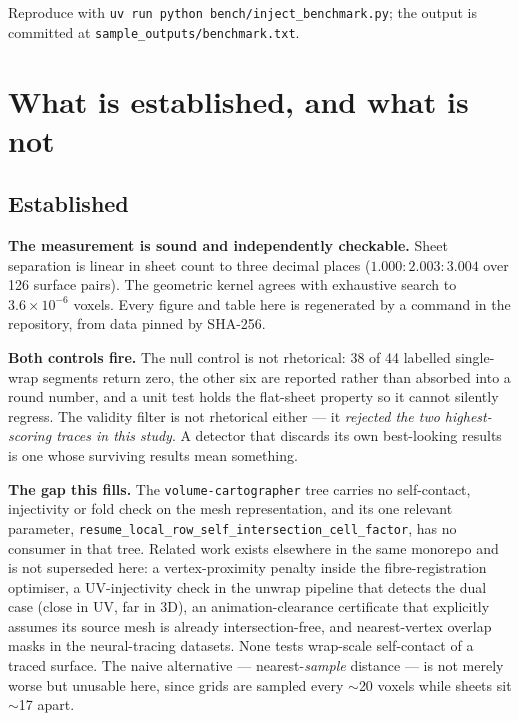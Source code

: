 \documentclass[11pt,a4paper]{article}
\begin{document}
\begin{sloppypar}
Reproduce with \texttt{uv run python bench/inject\_benchmark.py};
the output is committed at \texttt{sample\_outputs/benchmark.txt}.
\end{sloppypar}

\section{What is established, and what is not}

\subsection*{Established}

\textbf{The measurement is sound and independently checkable.} Sheet separation
is linear in sheet count to three decimal places ($1.000 : 2.003 : 3.004$ over
126 surface pairs). The geometric kernel agrees with exhaustive search to
$3.6\times10^{-6}$ voxels. Every figure and table here is regenerated by a
command in the repository, from data pinned by SHA-256.

\textbf{Both controls fire.} The null control is not rhetorical: 38 of 44
labelled single-wrap segments return zero, the other six are reported rather
than absorbed into a round number, and a unit test holds the flat-sheet property
so it cannot silently regress. The validity filter is not
rhetorical either --- it \emph{rejected the two highest-scoring traces in this
study}. A detector that discards its own best-looking results is one whose
surviving results mean something.

\textbf{The gap this fills.} The \texttt{volume-cartographer} tree carries no
self-contact, injectivity or fold check on the mesh representation, and its one
relevant parameter,
\texttt{resume\_local\_row\_\allowbreak self\_intersection\_\allowbreak cell\_factor},
has no consumer in that tree. Related work exists elsewhere in the same monorepo and is not
superseded here: a vertex-proximity penalty inside the fibre-registration
optimiser, a UV-injectivity check in the unwrap pipeline that detects the dual
case (close in UV, far in 3D), an animation-clearance certificate that
explicitly assumes its source mesh is already intersection-free, and
nearest-vertex overlap masks in the neural-tracing datasets. None tests
wrap-scale self-contact of a traced surface. The naive alternative --- nearest-\emph{sample} distance ---
is not merely worse but unusable here, since grids are sampled every $\sim$20
voxels while sheets sit $\sim$17 apart.
\end{document}
